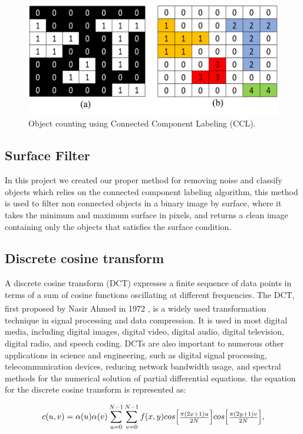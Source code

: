 \begin{figure}[H]
\centering
    \centerline{\includegraphics[width = 4.6in]{../images/object-counting-using-connected.png}}
    \caption{Object counting using Connected Component Labeling (CCL).}
    \label{fig:connected_component_labeling}
\end{figure}
\subsection{Surface Filter}
In this project we created our proper method for removing noise and classify objects which relies on the connected component labeling algorithm, this method is used to filter non connected objects in a binary image by surface, where it takes the minimum and maximum surface in pixels, and returns a clean image containing only the objects that satisfies the surface condition.

\subsection{Discrete cosine transform}
\hspace{\parindent}
A discrete cosine transform (DCT) expresses a finite sequence of data points in terms of a sum of cosine functions oscillating at different frequencies. The DCT, first proposed by Nasir Ahmed in 1972 \textsuperscript{\cite{ahmed1974discrete}}, is a widely used transformation technique in signal processing and data compression. It is used in most digital media, including digital images, digital video, digital audio, digital television, digital radio, and speech coding. DCTs are also important to numerous other applications in science and engineering, such as digital signal processing, telecommunication devices, reducing network bandwidth usage, and spectral methods for the numerical solution of partial differential equations.
the equation for the discrete cosine transform is represented as:

\begin{equation}
    c(u,v)=\alpha (u)\alpha (v)\sum_{u=0}^{N-1}\sum_{v=0}^{N-1} f(x,y) cos {\begin{bmatrix} {{\pi (2x + 1)u}\over{2N}} \end{bmatrix}} cos {\begin{bmatrix} {{\pi (2y + 1)v}\over{2N}} \end{bmatrix}} ,
    \label{eq:Discrete cosine transform equation}
\end{equation}

